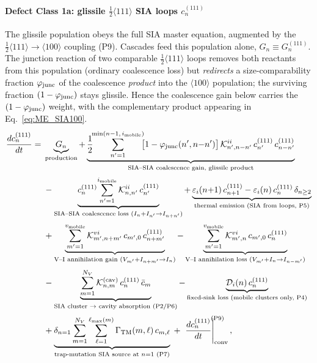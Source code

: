\paragraph{Defect Class 1a: glissile $\tfrac12\langle111\rangle$ SIA loops $c^{(111)}_n$}
\label{sec:ME_SIA}
The glissile population obeys the full SIA master equation, augmented by the
$\tfrac12\langle111\rangle\!\to\!\langle100\rangle$ coupling (P9). Cascades feed
this population alone, $G_n\equiv G_n^{(111)}$. The junction reaction of two
comparable $\tfrac12\langle111\rangle$ loops removes both reactants from this
population (ordinary coalescence loss) but \emph{redirects} a size-comparability
fraction $\varphi_{\rm junc}$ of the coalescence \emph{product} into the
$\langle100\rangle$ population; the surviving fraction $(1-\varphi_{\rm junc})$
stays glissile. Hence the coalescence gain below carries the
$(1-\varphi_{\rm junc})$ weight, with the complementary product appearing in
Eq.~\eqref{eq:ME_SIA100}.
\begin{equation}\label{eq:ME_SIA}
\begin{split}
\frac{dc^{(111)}_n}{dt} = {} &
  \underbrace{G_n}_{\text{production}}
  + \underbrace{
     \frac{1}{2}\!\!\sum_{n'=1}^{\min(n-1,\,i_{\rm mobile})}\!\!
     \bigl[1-\varphi_{\rm junc}(n',n{-}n')\bigr]\,
     \mathcal{K}_{n',n-n'}^{ii}\,c^{(111)}_{n'}\,c^{(111)}_{n-n'}
     }_{\text{SIA--SIA coalescence gain, glissile product}}
  \\[2pt]
  &- \underbrace{
     c^{(111)}_n\!\sum_{n'=1}^{i_{\rm mobile}}
     \mathcal{K}_{n,n'}^{ii}\,c^{(111)}_{n'}
     }_{\text{SIA--SIA coalescence loss } (I_n+I_{n'}\to I_{n+n'})}
  + \underbrace{
     \varepsilon_i(n{+}1)\,c^{(111)}_{n+1}
   - \varepsilon_i(n)\,c^{(111)}_n\,\delta_{n \geq 2}
     }_{\text{thermal emission (SIA from loops, P5)}}
  \\[2pt]
  &+ \underbrace{
     \sum_{m'=1}^{v_{\rm mobile}}
     \mathcal{K}_{m',n+m'}^{vi}\,c_{m',0}\,c^{(111)}_{n+m'}
     }_{\text{V--I annihilation gain } (V_{m'}+I_{n+m'}\to I_n)}
  - \underbrace{
     \sum_{m'=1}^{v_{\rm mobile}}
     \mathcal{K}_{m',n}^{vi}\,c_{m',0}\,c^{(111)}_n
     }_{\text{V--I annihilation loss } (V_{m'}+I_n\to I_{n-m'})}
  \\[2pt]
  &- \underbrace{
     \sum_{m=1}^{N_V}
     \mathcal{K}_{n,m}^{(\mathrm{cav})}\,c^{(111)}_n\,\bar{c}_m
     }_{\text{SIA cluster $\to$ cavity absorption (P2/P6)}}
  - \underbrace{
     \mathcal{D}_i(n)\,c^{(111)}_n
     }_{\text{fixed-sink loss (mobile clusters only, P4)}}
  \\[2pt]
  &+ \underbrace{
     \delta_{n=1}\sum_{m=1}^{N_V}\sum_{\ell=1}^{\ell_{\max}(m)}
     \Gamma_{\mathrm{TM}}(m,\ell)\,c_{m,\ell}
     }_{\text{trap-mutation SIA source at }n{=}1\text{ (P7)}}
  \;+\; \left.\frac{dc^{(111)}_n}{dt}\right|_{\mathrm{conv}}^{\!\!\!(\mathrm{P9})},
\end{split}
\end{equation}
